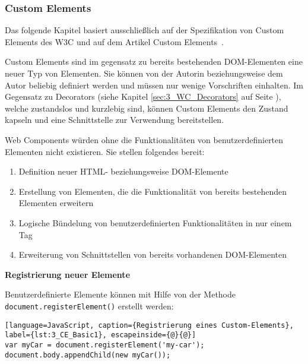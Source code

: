 \subsubsection{Custom Elements}
\label{sec:3_WC_Elements}

Das folgende Kapitel basiert ausschließlich auf der Spezifikation von Custom Elements des W3C \citereset \autocite[siehe][]{Glakov.2013} und auf dem Artikel \glqq Custom Elements\grqq\ \citereset \autocite[siehe][]{BidelmanCustomElements.2013}.

Custom Elements sind im gegensatz zu bereits bestehenden DOM-Elementen eine neuer Typ von Elementen. Sie können von der Autorin beziehungsweise dem Autor beliebig definiert werden und müssen nur wenige Vorschriften einhalten. Im Gegensatz zu Decorators (siehe Kapitel \ref{sec:3_WC_Decorators} auf Seite \pageref{sec:3_WC_Decorators}), welche zustandslos und kurzlebig sind, können Custom Elements den Zustand kapseln und eine Schnittstelle zur Verwendung bereitstellen.

Web Components würden ohne die Funktionalitäten von benutzerdefinierten Elementen nicht existieren. Sie stellen folgendes bereit:
\begin{enumerate}
\item Definition neuer HTML- beziehungsweise DOM-Elemente
\item Erstellung von Elementen, die die Funktionalität von bereits bestehenden Elementen erweitern
\item Logische Bündelung von benutzerdefinierten Funktionalitäten in nur einem Tag
\item Erweiterung von Schnittstellen von bereits vorhandenen DOM-Elementen
\end{enumerate}

\textbf{Registrierung neuer Elemente}

Benutzerdefinierte Elemente können mit Hilfe von der Methode \lstinline|document.registerElement()| erstellt werden:

\begin{lstlisting}[language=JavaScript, caption={Registrierung eines Custom-Elements}, label={lst:3_CE_Basic1}, escapeinside={@}{@}]
var myCar = document.registerElement('my-car');
document.body.appendChild(new myCar());
\end{lstlisting}

